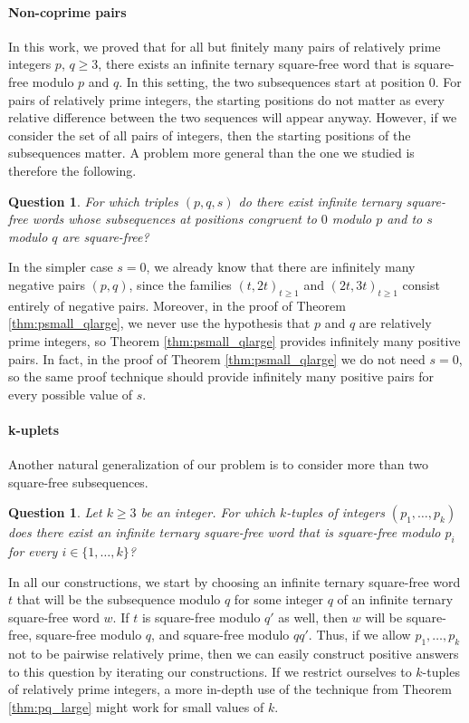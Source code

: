 \documentclass[12pt]{article}
\newtheorem{question}[theorem]{Question}
\theoremstyle{definition}
\begin{document}
\paragraph{Non-coprime pairs}
In this work, we proved that for all but finitely many pairs of relatively prime integers $p$, $q \geq 3$, there exists an infinite ternary square-free word that is square-free modulo $p$ and $q$. In this setting, the two subsequences start at position $0$. For pairs of relatively prime integers, the starting positions do not matter as every relative difference between the two sequences will appear anyway. However, if we consider the set of all pairs of integers, then the starting positions of the subsequences matter. A problem more general than the one we studied is therefore the following.

\begin{question}
For which triples $(p, q, s)$ do there exist infinite ternary square-free words whose subsequences at positions congruent to $0$ modulo $p$ and to $s$ modulo $q$ are square-free?
\end{question}

In the simpler case $s = 0$, we already know that there are infinitely many negative pairs $(p, q)$, since the families $(t, 2t)_{t \geq 1}$ and $(2t, 3t)_{t \geq 1}$ consist entirely of negative pairs.
Moreover, in the proof of Theorem \ref{thm:psmall_qlarge}, we never use the hypothesis that $p$ and $q$ are relatively prime integers, so Theorem \ref{thm:psmall_qlarge} provides infinitely many positive pairs. In fact, in the proof of Theorem \ref{thm:psmall_qlarge} we do not need $s = 0$, so the same proof technique should provide infinitely many positive pairs for every possible value of $s$. 

\paragraph{k-uplets}

Another natural generalization of our problem is to consider more than two square-free subsequences.

\begin{question}
Let $k \geq 3$ be an integer. For which $k$-tuples of integers $(p_1, \dots, p_k)$ does there exist an infinite ternary square-free word that is square-free modulo $p_i$ for every $i \in \{1, \dots, k\}$?
\end{question}

In all our constructions, we start by choosing an infinite ternary square-free word $t$ that will be the subsequence modulo $q$ for some integer $q$ of an infinite ternary square-free word $w$. If $t$ is square-free modulo $q'$ as well, then $w$ will be square-free, square-free modulo $q$, and square-free modulo $qq'$. Thus, if we allow $p_1, \dots, p_k$ not to be pairwise relatively prime, then we can easily construct positive answers to this question by iterating our constructions. If we restrict ourselves to $k$-tuples of relatively prime integers, a more in-depth use of the technique from Theorem \ref{thm:pq_large} might work for small values of $k$.
\end{document}
